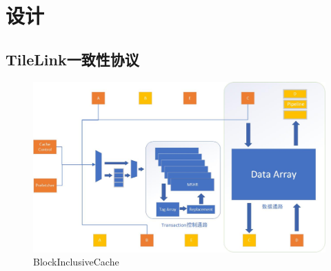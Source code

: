 \chapter{设计}\label{chap:design}

\section{TileLink一致性协议}

\begin{figure}[H] %
\centering %
\includegraphics[width=\textwidth]{Img/BlockInclusiveCache.jpg} %
\caption{BlockInclusiveCache} %
\label{BlockInclusiveCache} %
\end{figure}

